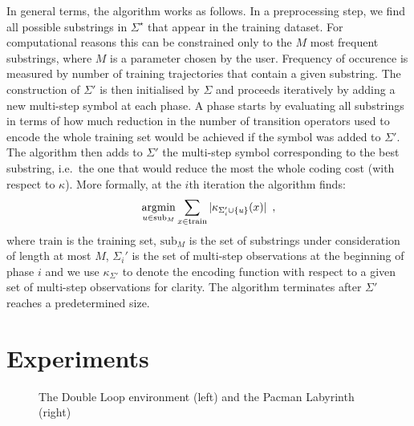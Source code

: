 \documentclass[letterpaper]{article}
\newcommand{\sstar}{\Sigma^\star}
\DeclareMathOperator*{\argmin}{\rm argmin}
\begin{document}
In general terms, the algorithm works as follows. In a preprocessing step, we find all possible substrings in $\sstar$ that appear in the training dataset. For computational reasons this can be constrained only to the $M$ most frequent substrings, where $M$ is a parameter chosen by the user. Frequency of occurence is measured by number of training trajectories that contain a given substring. The construction of $\Sigma'$ is then initialised by $\Sigma$ and proceeds iteratively by adding a new multi-step symbol at each phase. A phase starts by evaluating all substrings in terms of how much reduction in the number of transition operators used to encode the whole training set would be achieved if the symbol was added to $\Sigma'$. The algorithm then adds to $\Sigma'$ the multi-step symbol corresponding to the best substring, i.e.\ the one that would reduce the most the whole coding cost (with respect to $\kappa$). More formally, at the $i$th iteration the algorithm finds:
\begin{equation*}
\argmin_{u \in \mathrm{sub}_M} \sum_{x \in \mathrm{train}} |\kappa_{\Sigma_i' \cup \{u\}}(x)| \enspace,
\end{equation*}
where $\mathrm{train}$ is the training set, $\mathrm{sub}_M$ is the set of substrings under consideration of length at most $M$, $\Sigma_i'$ is the set of multi-step observations at the beginning of phase $i$ and we use $\kappa_{\Sigma'}$ to denote the encoding function with respect to a given set of multi-step observations for clarity. The algorithm terminates after $\Sigma'$ reaches a predetermined size.

\section{Experiments}\label{sec:exp}

\begin{figure}[t]
\centering
{}
\hspace{1em}
\caption{The Double Loop environment (left) and the Pacman Labyrinth (right)\label{fig-overflow}\vspace*{-4mm}}
\end{figure}
\end{document}
